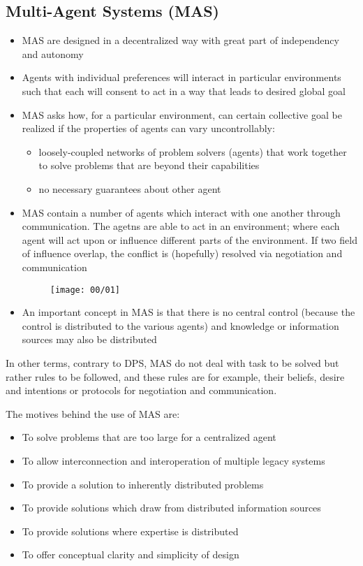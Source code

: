 \subsection{Multi-Agent Systems (MAS)}
\begin{itemize}
\item MAS are designed in a decentralized way with great part of independency and autonomy
\item Agents with individual preferences will interact in particular environments such that each will consent to act in a way that leads to desired global goal
\item MAS asks how, for a particular environment, can certain collective goal be realized if the properties of agents can vary uncontrollably:
\begin{itemize}
\item loosely-coupled networks of problem solvers (agents) that work together to solve problems that are beyond their capabilities
\item no necessary guarantees about other agent
\end{itemize}
\item MAS contain a number of agents which interact with one another through communication. The agetns are able to act in an environment; where each agent will act upon or influence different parts of the environment. If two field of influence overlap, the conflict is (hopefully) resolved via negotiation and communication

\begin{figure}[!h]
\centering
\texttt{[image: 00/01]}
\end{figure}

\item An important concept in MAS is that there is no central control (because the control is distributed to the various agents) and knowledge or information sources may also be distributed
\end{itemize}

In other terms, contrary to DPS, MAS do not deal with task to be solved but rather rules to be followed, and these rules are for example, their beliefs, desire and intentions or protocols for negotiation and communication.

The motives behind the use of MAS are:
\begin{itemize}
\item To solve problems that are too large for a centralized agent
\item To allow interconnection and interoperation of multiple legacy systems
\item To provide a solution to inherently distributed problems
\item To provide solutions which draw from distributed information sources
\item To provide solutions where expertise is distributed
\item To offer conceptual clarity and simplicity of design
\end{itemize}

